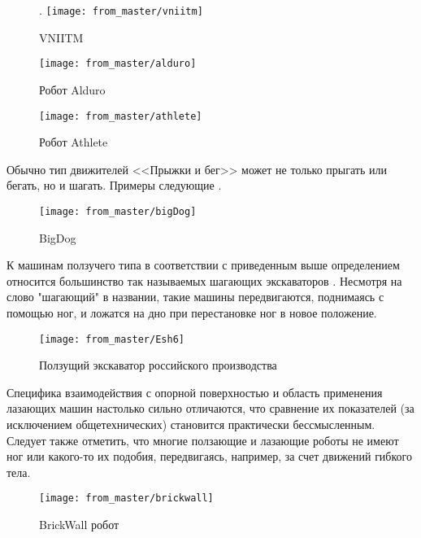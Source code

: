 \begin{figure}[H].
\centering\texttt{[image: from\_master/vniitm]}
\caption{VNIITM}
\label{fig:vniitm}
\end{figure}

\begin{figure}[H]
\centering\texttt{[image: from\_master/alduro]}
\caption{Робот Alduro}
\label{fig:alduro}
\end{figure}

\begin{figure}[H]
\centering\texttt{[image: from\_master/athlete]}
\caption{Робот Athlete}
\label{fig:athlete}
\end{figure}

Обычно тип движителей <<Прыжки и бег>> может не только прыгать или бегать, но и шагать. Примеры следующие \cite{Pavl2013,volkovaModelirovanieDvizheniyaMnogozvennogo2013,bidgoly2010learning,yacunVibrorobotDlyaVertikalnogo2010} .

\begin{figure}[H]
    \centering\texttt{[image: from\_master/bigDog]}
\caption{BigDog}
\label{fig:bigDog}
\end{figure}

К машинам ползучего типа в соответствии с приведенным выше определением относится большинство так называемых шагающих экскаваторов . Несмотря на слово "шагающий" в названии, такие машины передвигаются, поднимаясь с помощью ног, и ложатся на дно при перестановке ног в новое положение.

\begin{figure}[H]
\centering\texttt{[image: from\_master/Esh6]}
\caption{Ползущий экскаватор российского производства}
\label{fig:Esh6}
\end{figure}

\cite{peters2010prototype,gradeckiySostoyaniePerspektivyRazvitiya2014,bidgoly2010learning} Специфика взаимодействия с опорной поверхностью и область применения лазающих машин настолько сильно отличаются, что сравнение их показателей (за исключением общетехнических) становится практически бессмысленным. Следует также отметить, что многие ползающие и лазающие роботы не имеют ног или какого-то их подобия, передвигаясь, например, за счет движений гибкого тела.

\begin{figure}[H]
\centering\texttt{[image: from\_master/brickwall]}
\caption{BrickWall робот}
\label{fig:brickwall}
\end{figure}

